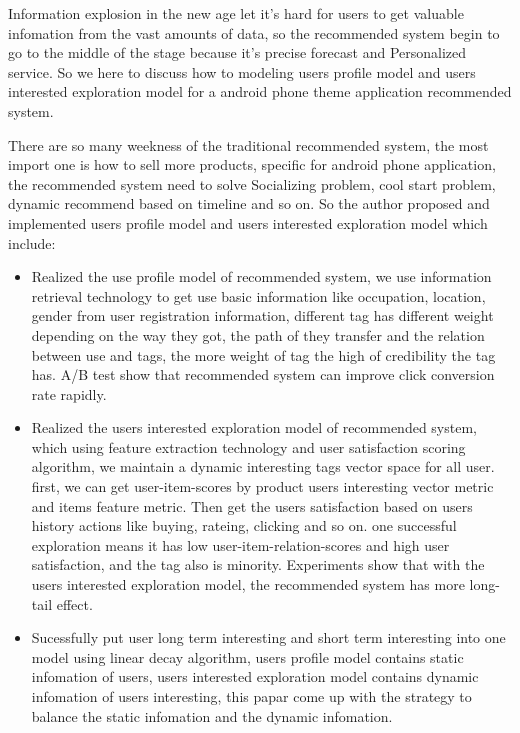 \begin{enabstract}
Information explosion in the new age let it's hard for users to get valuable infomation from the vast amounts of data, so the recommended system begin to go to the middle of the stage because it's precise forecast and Personalized service. So we here to discuss how to modeling users profile model and users interested exploration model for a android phone theme application recommended system.

There are so many weekness of the traditional recommended system, the most import one is how to sell more products, specific for android phone application, the recommended system need to solve Socializing problem, cool start problem, dynamic recommend based on timeline and so on. So the author proposed and implemented users profile model and users interested exploration model which include: 
\begin{itemize}
	\item Realized the use profile model of recommended system, we use information retrieval technology to get use basic information like occupation, location, gender from user registration information, different tag has different weight depending on the way they got, the path of they transfer and the relation between use and tags, the more weight of tag the high of credibility the tag has. A/B test show that recommended system can improve click conversion rate rapidly.
	\item Realized the users interested exploration model of recommended system, which using feature extraction technology and user satisfaction scoring algorithm, we maintain a dynamic interesting tags vector space for all user. first, we can get user-item-scores by product users interesting vector metric and items feature metric. Then get the users satisfaction based on users history actions like buying, rateing, clicking and so on. one successful exploration means it has low user-item-relation-scores and high user satisfaction, and the tag also is minority. Experiments show that with the users interested exploration model, the recommended system has more long-tail effect.
	\item Sucessfully put user long term interesting and short term interesting into one model using linear decay algorithm, users profile model contains static infomation of users, users interested exploration model contains dynamic infomation of users interesting, this papar come up with the strategy to balance the static infomation and the dynamic infomation.
\end{itemize}
\end{enabstract}
